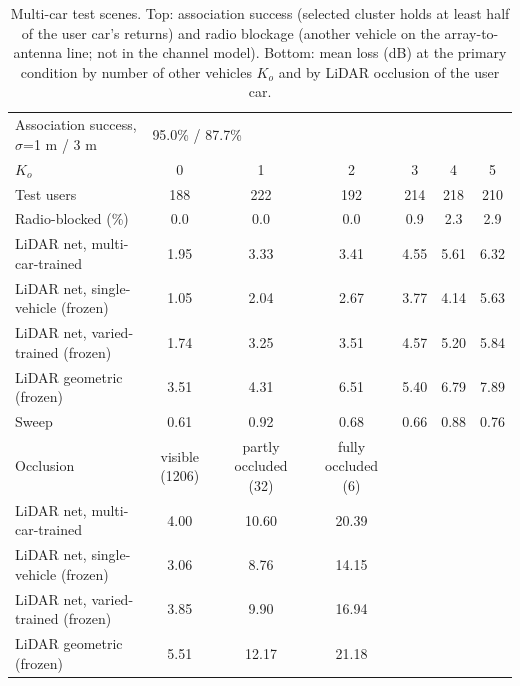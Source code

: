 \begin{table}[t]\centering\caption{Multi-car test scenes. Top: association success (selected cluster holds at least half of the user car's returns) and radio blockage (another vehicle on the array-to-antenna line; not in the channel model). Bottom: mean loss (dB) at the primary condition by number of other vehicles $K_o$ and by LiDAR occlusion of the user car.}\label{tab:multicar_scene}
\small\begin{tabular}{@{}lcccccc@{}}\toprule
Association success, $\sigma$=1 m / 3 m & \multicolumn{6}{l}{95.0\% / 87.7\%} \\
$K_o$ & 0 & 1 & 2 & 3 & 4 & 5 \\
Test users & 188 & 222 & 192 & 214 & 218 & 210 \\
Radio-blocked (\%) & 0.0 & 0.0 & 0.0 & 0.9 & 2.3 & 2.9 \\\midrule
LiDAR net, multi-car-trained & 1.95 & 3.33 & 3.41 & 4.55 & 5.61 & 6.32 \\
LiDAR net, single-vehicle (frozen) & 1.05 & 2.04 & 2.67 & 3.77 & 4.14 & 5.63 \\
LiDAR net, varied-trained (frozen) & 1.74 & 3.25 & 3.51 & 4.57 & 5.20 & 5.84 \\
LiDAR geometric (frozen) & 3.51 & 4.31 & 6.51 & 5.40 & 6.79 & 7.89 \\
Sweep & 0.61 & 0.92 & 0.68 & 0.66 & 0.88 & 0.76 \\\midrule
Occlusion & visible (1206) & partly occluded (32) & fully occluded (6) & \multicolumn{3}{c}{} \\
LiDAR net, multi-car-trained & 4.00 & 10.60 & 20.39 & \multicolumn{3}{c}{} \\
LiDAR net, single-vehicle (frozen) & 3.06 & 8.76 & 14.15 & \multicolumn{3}{c}{} \\
LiDAR net, varied-trained (frozen) & 3.85 & 9.90 & 16.94 & \multicolumn{3}{c}{} \\
LiDAR geometric (frozen) & 5.51 & 12.17 & 21.18 & \multicolumn{3}{c}{} \\
\bottomrule\end{tabular}\end{table}
